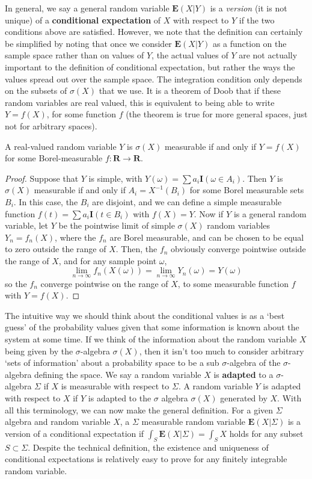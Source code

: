 In general, we say a general random variable $\mathbf{E}(X|Y)$ is a {\it version} (it is not unique) of a {\bf conditional expectation} of $X$ with respect to $Y$ if the two conditions above are satisfied. However, we note that the definition can certainly be simplified by noting that once we consider $\mathbf{E}(X|Y)$ as a function on the sample space rather than on values of $Y$, the actual values of $Y$ are not actually important to the definition of conditional expectation, but rather the ways the values spread out over the sample space. The integration condition only depends on the subsets of $\sigma(X)$ that we use. It is a theorem of Doob that if these random variables are real valued, this is equivalent to being able to write $Y = f(X)$, for some function $f$ (the theorem is true for more general spaces, just not for arbitrary spaces).

\begin{lemma}
    A real-valued random variable $Y$ is $\sigma(X)$ measurable if and only if $Y = f(X)$ for some Borel-measurable $f: \mathbf{R} \to \mathbf{R}$.
\end{lemma}
\begin{proof}
    Suppose that $Y$ is simple, with $Y(\omega) = \sum a_i \mathbf{I}(\omega \in A_i)$. Then $Y$ is $\sigma(X)$ measurable if and only if $A_i = X^{-1}(B_i)$ for some Borel measurable sets $B_i$. In this case, the $B_i$ are disjoint, and we can define a simple measurable function $f(t) = \sum a_i\mathbf{I}(t \in B_i)$ with $f(X) = Y$. Now if $Y$ is a general random variable, let $Y$ be the pointwise limit of simple $\sigma(X)$ random variables $Y_n = f_n(X)$, where the $f_n$ are Borel measurable, and can be chosen to be equal to zero outside the range of $X$. Then, the $f_n$ obviously converge pointwise outside the range of $X$, and for any sample point $\omega$,
    \[ \lim_{n \to \infty} f_n(X(\omega)) = \lim_{n \to \infty} Y_n(\omega) = Y(\omega) \]
    so the $f_n$ converge pointwise on the range of $X$, to some measurable function $f$ with $Y = f(X)$.
\end{proof}

The intuitive way we should think about the conditional values is as a `best guess' of the probability values given that some information is known about the system at some time. If we think of the information about the random variable $X$ being given by the $\sigma$-algebra $\sigma(X)$, then it isn't too much to consider arbitrary `sets of information' about a probability space to be a sub $\sigma$-algebra of the $\sigma$-algebra defining the space. We say a random variable $X$ is {\bf adapted} to a $\sigma$-algebra $\Sigma$ if $X$ is measurable with respect to $\Sigma$. A random variable $Y$ is adapted with respect to $X$ if $Y$ is adapted to the $\sigma$ algebra $\sigma(X)$ generated by $X$. With all this terminology, we can now make the general definition. For a given $\Sigma$ algebra and random variable $X$, a $\Sigma$ measurable random variable $\mathbf{E}(X|\Sigma)$ is a version of a conditional expectation if $\int_S \mathbf{E}(X|\Sigma) = \int_S X$ holds for any subset $S \subset \Sigma$. Despite the technical definition, the existence and uniqueness of conditional expectations is relatively easy to prove for any finitely integrable random variable.

